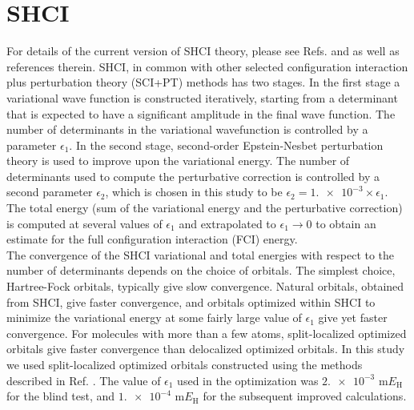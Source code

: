 \documentclass[journal=jcp,manuscript=suppinfo]{achemso}
\begin{document}
\section{SHCI}

For details of the current version of SHCI theory, please see Refs.  and  as well as references therein. SHCI, in common with other selected configuration interaction plus perturbation theory (SCI+PT) methods has two stages. In the first stage a variational wave function is constructed iteratively, starting from a determinant that is expected to have a significant amplitude in the final wave function. The number of determinants in the variational wavefunction is controlled by a parameter $\epsilon_1$. In the second stage, second-order Epstein-Nesbet perturbation theory is used to improve upon the variational energy. The number of determinants used to compute the perturbative correction is controlled by a second parameter $\epsilon_2$, which is chosen in this study to be $\epsilon_2 = \num{1.e-3} \times \epsilon_1$. The total energy (sum of the variational energy and the perturbative correction) is computed at several values of $\epsilon_1$ and extrapolated to $\epsilon_1 \to 0$ to obtain an estimate for the full configuration interaction (FCI) energy.\\

The convergence of the SHCI variational and total energies with respect to the number of determinants depends on the choice of orbitals. The simplest choice, Hartree-Fock orbitals, typically give slow convergence. Natural orbitals, obtained from SHCI, give faster convergence, and orbitals optimized within SHCI to minimize the variational energy at some fairly large value of $\epsilon_1$ give yet faster convergence. For molecules with more than a few atoms, split-localized optimized orbitals give faster convergence than delocalized optimized orbitals. In this study we used split-localized optimized orbitals constructed using the methods described in Ref. . The value of $\epsilon_1$ used in the optimization was $\num{2.e-3}$ m$E_{\text{H}}$ for the blind test, and $\num{1.e-4}$ m$E_{\text{H}}$ for the subsequent improved calculations.\\
\end{document}
